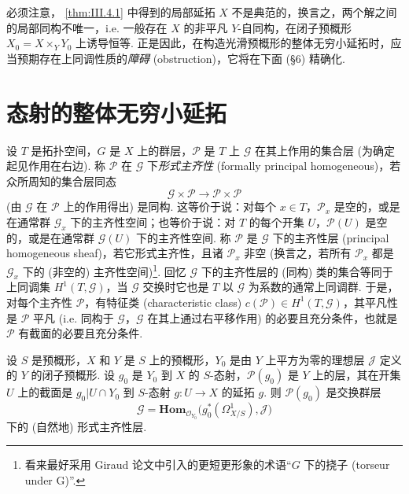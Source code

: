 \begin{remark}\label{rem:III.4.3}
必须注意， \ref{thm:III.4.1} 中得到的局部延拓 $X$ 不是典范的，换言之，两个解之间的局部同构不唯一，i.e. 一般存在 $X$ 的非平凡 $Y$-自同构，在闭子预概形 $X_0 = X \times_Y Y_0$ 上诱导恒等. 正是因此，在构造光滑预概形的整体无穷小延拓时，应当预期存在上同调性质的\emph{障碍} (obstruction)，它将在下面 (§6) 精确化.
\end{remark}

\section{态射的整体无穷小延拓}

设 $T$ 是拓扑空间，$G$ 是 $X$ 上的群层，$\mathcal{P}$ 是 $T$ 上 $\mathcal{G}$ 在其上作用的集合层 (为确定起见作用在右边). 称 $\mathcal{P}$ 在 $\mathcal{G}$ 下\emph{形式主齐性} (formally principal homogeneous)，若众所周知的集合层同态
\[
\mathcal{G} \times \mathcal{P} \longrightarrow \mathcal{P} \times \mathcal{P}
\]
(由 $\mathcal{G}$ 在 $\mathcal{P}$ 上的作用得出) 是同构. 这等价于说：对每个 $x \in T$，$\mathcal{P}_x$ 是空的，或是在通常群 $\mathcal{G}_x$ 下的主齐性空间；也等价于说：对 $T$ 的每个开集 $U$，$\mathcal{P}(U)$ 是空的，或是在通常群 $\mathcal{G}(U)$ 下的主齐性空间. 称 $\mathcal{P}$ 是 $\mathcal{G}$ 下的主齐性层 (principal homogeneous sheaf)，若它形式主齐性，且诸 $\mathcal{P}_x$ 非空 (换言之，若所有 $\mathcal{P}_x$ 都是 $\mathcal{G}_x$ 下的 (非空的) 主齐性空间)\footnote{看来最好采用 Giraud 论文中引入的更短更形象的术语``$G$ 下的挠子 (torseur under G)''.}. 回忆 $\mathcal{G}$ 下的主齐性层的 (同构) 类的集合等同于上同调集 $H^1(T, \mathcal{G})$，当 $\mathcal{G}$ 交换时它也是 $T$ 以 $\mathcal{G}$ 为系数的通常上同调群. 于是，对每个主齐性 $\mathcal{P}$，有特征类 (characteristic class) $c(\mathcal{P}) \in H^1(T, \mathcal{G})$，其平凡性是 $\mathcal{P}$ 平凡 (i.e. 同构于 $\mathcal{G}$，$\mathcal{G}$ 在其上通过右平移作用) 的必要且充分条件，也就是 $\mathcal{P}$ 有截面的必要且充分条件.

\begin{proposition}\label{prop:III.5.1}
设 $S$ 是预概形，$X$ 和 $Y$ 是 $S$ 上的预概形，$Y_0$ 是由 $Y$ 上平方为零的理想层 $\mathcal{J}$ 定义的 $Y$ 的闭子预概形. 设 $g_0$ 是 $Y_0$ 到 $X$ 的 $S$-态射，$\mathcal{P}(g_0)$ 是 $Y$ 上的层，其在开集 $U$ 上的截面是 $g_0|U \cap Y_0$ 到 $S$-态射 $g \colon U \to X$ 的延拓 $g$. 则 $\mathcal{P}(g_0)$ 是交换群层
\[
\mathcal{G} = \mathbf{Hom}_{\mathcal{O}_{Y_0}}\bigl(g_0^{*}(\varOmega_{X/S}^{1}), \mathcal{J}\bigr)
\]
下的 (自然地) 形式主齐性层.
\end{proposition}

